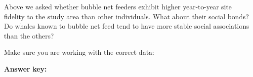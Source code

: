 \documentclass[
]{book}
\newenvironment{Shaded}{\begin{snugshade}}{\end{snugshade}}
\newcommand{\CommentTok}[1]{\textcolor[rgb]{0.56,0.35,0.01}{\textit{#1}}}
\newcommand{\DecValTok}[1]{\textcolor[rgb]{0.00,0.00,0.81}{#1}}
\newcommand{\KeywordTok}[1]{\textcolor[rgb]{0.13,0.29,0.53}{\textbf{#1}}}
\newcommand{\NormalTok}[1]{#1}
\newcommand{\OperatorTok}[1]{\textcolor[rgb]{0.81,0.36,0.00}{\textbf{#1}}}
\newcommand{\StringTok}[1]{\textcolor[rgb]{0.31,0.60,0.02}{#1}}
\begin{document}
Above we asked whether bubble net feeders exhibit higher year-to-year site fidelity to the study area than other individuals. What about their social bonds? Do whales known to bubble net feed tend to have more stable social associations than the others?

Make sure you are working with the correct data:

\begin{Shaded}
\end{Shaded}

\textbf{Answer key:}
\end{document}
